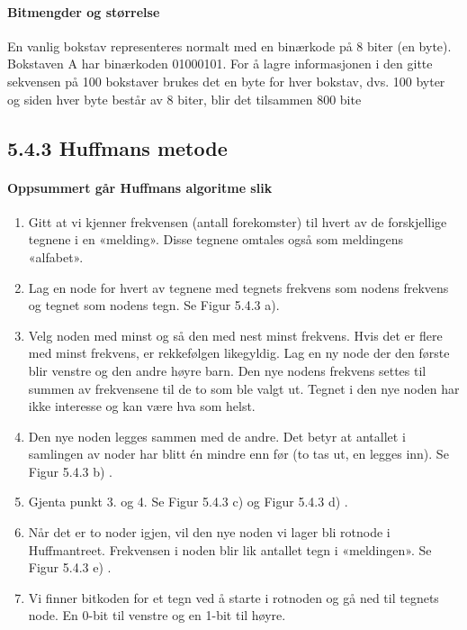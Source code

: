 \documentclass[11pt]{article}
\begin{document}
        \paragraph{Bitmengder og størrelse}
        En vanlig bokstav representeres normalt med en binærkode på 8 biter (en byte). Bokstaven A
        har binærkoden 01000101. For å lagre informasjonen i
        den gitte sekvensen på 100 bokstaver brukes det en byte for hver bokstav, dvs. 100 byter og
        siden hver byte består av 8 biter, blir det tilsammen 800 bite

    \subsection{5.4.3 Huffmans metode}
        \paragraph{Oppsummert går Huffmans algoritme slik}
            \begin{enumerate}
                \item Gitt at vi kjenner frekvensen (antall forekomster) til hvert av de forskjellige tegnene i
                    en «melding». Disse tegnene omtales også som meldingens «alfabet».
                \item Lag en node for hvert av tegnene med tegnets frekvens som nodens frekvens og tegnet
                    som nodens tegn. Se Figur 5.4.3 a).
                \item Velg noden med minst og så den med nest minst frekvens. Hvis det er flere med minst
                    frekvens, er rekkefølgen likegyldig. Lag en ny node der den første blir venstre og den
                    andre høyre barn. Den nye nodens frekvens settes til summen av frekvensene til de to
                    som ble valgt ut. Tegnet i den nye noden har ikke interesse og kan være hva som helst.
                \item Den nye noden legges sammen med de andre. Det betyr at antallet i samlingen av
                    noder har blitt én mindre enn før (to tas ut, en legges inn). Se Figur 5.4.3 b) .
                \item Gjenta punkt 3. og 4. Se Figur 5.4.3 c) og Figur 5.4.3 d) .
                \item Når det er to noder igjen, vil den nye noden vi lager bli rotnode i Huffmantreet.
                    Frekvensen i noden blir lik antallet tegn i «meldingen». Se Figur 5.4.3 e) .
                \item Vi finner bitkoden for et tegn ved å starte i rotnoden og gå ned til tegnets node. En
                    0-bit til venstre og en 1-bit til høyre.
            \end{enumerate}
\end{document}
